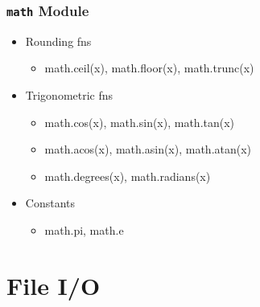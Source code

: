 \documentclass{article}
\begin{document}
\subsubsection{\texttt{math} Module}
    \begin{multicols}{2}
        \begin{itemize}
            \item Rounding fns
                \begin{itemize}
                    \item math.ceil(x), math.floor(x), math.trunc(x)
                \end{itemize}
            \item Trigonometric fns
                \begin{itemize}
                    \item math.cos(x), math.sin(x), math.tan(x)
                    \item math.acos(x), math.asin(x), math.atan(x)
                    \item math.degrees(x), math.radians(x)
                \end{itemize}
            \item Constants
                \begin{itemize}
                    \item math.pi, math.e
                \end{itemize}
        \end{itemize}
    \end{multicols}

\section{File I/O}
\end{document}
